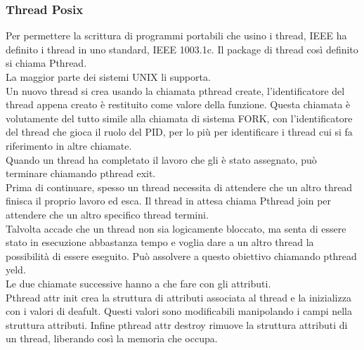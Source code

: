 \documentclass{article}
\begin{document}
\subsubsection{Thread Posix}
Per permettere la scrittura di programmi portabili che usino i thread, IEEE ha definito i thread in uno standard, IEEE 1003.1c. Il package di thread così definito si chiama Pthread.
\\La maggior parte dei sistemi UNIX li supporta.
\\Un nuovo thread si crea usando la chiamata pthread create, l’identificatore del thread appena creato è restituito come valore della funzione. Questa chiamata è volutamente del tutto simile alla chiamata di sistema FORK, con l’identificatore del thread che gioca il ruolo del PID, per lo più per identificare i thread cui si fa riferimento in altre chiamate.
\\Quando un thread ha completato il lavoro che gli è stato assegnato, può terminare chiamando pthread exit.
\\Prima di continuare, spesso un thread necessita di attendere che un altro thread finisca il proprio lavoro ed esca. Il thread in attesa chiama Pthread join per attendere che un altro specifico thread termini. 
\\Talvolta accade che un thread non sia logicamente bloccato, ma senta di essere stato in esecuzione abbastanza tempo e voglia dare a un altro thread la possibilità di essere eseguito. Può assolvere a questo obiettivo chiamando pthread yeld.
\\Le due chiamate successive hanno a che fare con gli attributi.
\\Pthread attr init crea la struttura di attributi associata al thread e la inizializza con i valori di deafult. Questi valori sono modificabili manipolando i campi nella struttura attributi. Infine pthread attr destroy rimuove la struttura attributi di un thread, liberando così la memoria che occupa.
\end{document}

